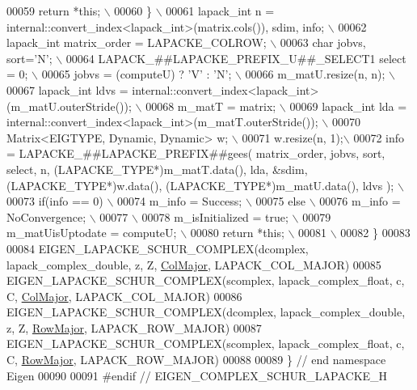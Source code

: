 \begin{DoxyCode}
00059 \textcolor{preprocessor}{      return *this; \(\backslash\)}
00060 \textcolor{preprocessor}{  \} \(\backslash\)}
00061 \textcolor{preprocessor}{  lapack\_int n = internal::convert\_index<lapack\_int>(matrix.cols()), sdim, info; \(\backslash\)}
00062 \textcolor{preprocessor}{  lapack\_int matrix\_order = LAPACKE\_COLROW; \(\backslash\)}
00063 \textcolor{preprocessor}{  char jobvs, sort='N'; \(\backslash\)}
00064 \textcolor{preprocessor}{  LAPACK\_##LAPACKE\_PREFIX\_U##\_SELECT1 select = 0; \(\backslash\)}
00065 \textcolor{preprocessor}{  jobvs = (computeU) ? 'V' : 'N'; \(\backslash\)}
00066 \textcolor{preprocessor}{  m\_matU.resize(n, n); \(\backslash\)}
00067 \textcolor{preprocessor}{  lapack\_int ldvs  = internal::convert\_index<lapack\_int>(m\_matU.outerStride()); \(\backslash\)}
00068 \textcolor{preprocessor}{  m\_matT = matrix; \(\backslash\)}
00069 \textcolor{preprocessor}{  lapack\_int lda = internal::convert\_index<lapack\_int>(m\_matT.outerStride()); \(\backslash\)}
00070 \textcolor{preprocessor}{  Matrix<EIGTYPE, Dynamic, Dynamic> w; \(\backslash\)}
00071 \textcolor{preprocessor}{  w.resize(n, 1);\(\backslash\)}
00072 \textcolor{preprocessor}{  info = LAPACKE\_##LAPACKE\_PREFIX##gees( matrix\_order, jobvs, sort, select, n,
       (LAPACKE\_TYPE*)m\_matT.data(), lda, &sdim, (LAPACKE\_TYPE*)w.data(), (LAPACKE\_TYPE*)m\_matU.data(), ldvs ); \(\backslash\)}
00073 \textcolor{preprocessor}{  if(info == 0) \(\backslash\)}
00074 \textcolor{preprocessor}{    m\_info = Success; \(\backslash\)}
00075 \textcolor{preprocessor}{  else \(\backslash\)}
00076 \textcolor{preprocessor}{    m\_info = NoConvergence; \(\backslash\)}
00077 \textcolor{preprocessor}{\(\backslash\)}
00078 \textcolor{preprocessor}{  m\_isInitialized = true; \(\backslash\)}
00079 \textcolor{preprocessor}{  m\_matUisUptodate = computeU; \(\backslash\)}
00080 \textcolor{preprocessor}{  return *this; \(\backslash\)}
00081 \textcolor{preprocessor}{\(\backslash\)}
00082 \textcolor{preprocessor}{\}}
00083 
00084 EIGEN\_LAPACKE\_SCHUR\_COMPLEX(dcomplex, lapack\_complex\_double, z, Z, \hyperlink{group__enums_ggaacded1a18ae58b0f554751f6cdf9eb13a0cbd4bdd0abcfc0224c5fcb5e4f6669a}{ColMajor}, LAPACK\_COL\_MAJOR)
00085 EIGEN\_LAPACKE\_SCHUR\_COMPLEX(scomplex, lapack\_complex\_float,  c, C, \hyperlink{group__enums_ggaacded1a18ae58b0f554751f6cdf9eb13a0cbd4bdd0abcfc0224c5fcb5e4f6669a}{ColMajor}, LAPACK\_COL\_MAJOR)
00086 EIGEN\_LAPACKE\_SCHUR\_COMPLEX(dcomplex, lapack\_complex\_double, z, Z, \hyperlink{group__enums_ggaacded1a18ae58b0f554751f6cdf9eb13acfcde9cd8677c5f7caf6bd603666aae3}{RowMajor}, LAPACK\_ROW\_MAJOR)
00087 EIGEN\_LAPACKE\_SCHUR\_COMPLEX(scomplex, lapack\_complex\_float,  c, C, \hyperlink{group__enums_ggaacded1a18ae58b0f554751f6cdf9eb13acfcde9cd8677c5f7caf6bd603666aae3}{RowMajor}, LAPACK\_ROW\_MAJOR)
00088 
00089 \} \textcolor{comment}{// end namespace Eigen}
00090 
00091 \textcolor{preprocessor}{#endif // EIGEN\_COMPLEX\_SCHUR\_LAPACKE\_H}
\end{DoxyCode}
